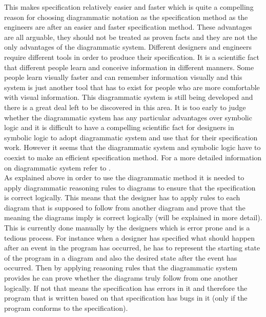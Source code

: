 \documentclass[10pt, a4paper, titlepage]{article}
\begin{document}
This makes specification relatively easier and faster which is quite a compelling reason for choosing diagrammatic notation as the specification method as the engineers are after an easier and faster specification method. These advantages are all arguable, they should not be treated as proven facts and they are not the only advantages of the diagrammatic system. Different designers and engineers require different tools in order to produce their specification. It is a scientific fact that different people learn and conceive information in different manners. Some people learn visually faster and can remember information visually and this system is just another tool that has to exist for people who are more comfortable with visual information. This diagrammatic system is still being developed and there is a great deal left to be discovered in this area. It is too early to judge whether the diagrammatic system has any particular advantages over symbolic logic and it is difficult to have a compelling scientific fact for designers in symbolic logic to adopt diagrammatic system and use that for their specification work. However it seems that the diagrammatic system and symbolic logic have to coexist to make an efficient specification method. For a more detailed information on diagrammatic system refer to \cite{Aidan_Gem}.\\
   
As explained above in order to use the diagrammatic method it is needed to apply diagrammatic reasoning rules to diagrams to ensure that the specification is correct logically. This means that the designer has to apply rules to each diagram that is supposed to follow from another diagram and prove that the meaning the diagrams imply is correct logically (will be explained in more detail). This is currently done manually by the designers which is error prone and is a tedious process. For instance when a designer has specified what should happen after an event in the program has occurred, he has to represent the starting state of the program in a diagram and also the desired state after the event has occurred. Then by applying reasoning rules that the diagrammatic system provides he can prove whether the diagrams truly follow from one another logically. If not that means the specification has errors in it and therefore the program that is written based on that specification has bugs in it (only if the program conforms to the specification). \\


\newpage
\end{document}
